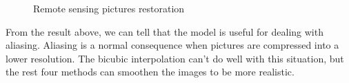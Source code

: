 \documentclass[10pt,twocolumn,letterpaper]{article}
\begin{document}
\begin{figure}[H]
    \caption{Remote sensing pictures restoration}
\end{figure}
From the result above, we can tell that the model is useful for dealing with aliasing.
Aliasing is a normal consequence when pictures are compressed into a lower resolution.
The bicubic interpolation can't do well with this situation, 
but the rest four methods can smoothen the images to be more realistic.
\end{document}
